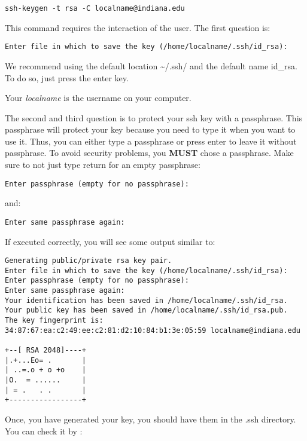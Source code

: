 \begin{verbatim}
ssh-keygen -t rsa -C localname@indiana.edu
\end{verbatim}

This command requires the interaction of the user. The first question
is:

\begin{verbatim}
Enter file in which to save the key (/home/localname/.ssh/id_rsa): 
\end{verbatim}

We recommend using the default location \textasciitilde{}/.ssh/ and the
default name id\_rsa. To do so, just press the enter key.

Your \emph{localname} is the username on your computer.

The second and third question is to protect your ssh key with a
passphrase. This passphrase will protect your key because you need to
type it when you want to use it. Thus, you can either type a passphrase
or press enter to leave it without passphrase. To avoid security
problems, you \textbf{MUST} chose a passphrase. Make sure to not just
type return for an empty passphrase:

\begin{verbatim}
Enter passphrase (empty for no passphrase):
\end{verbatim}

and:

\begin{verbatim}
Enter same passphrase again:
\end{verbatim}

If executed correctly, you will see some output similar to:

\begin{verbatim}
Generating public/private rsa key pair.
Enter file in which to save the key (/home/localname/.ssh/id_rsa): 
Enter passphrase (empty for no passphrase):
Enter same passphrase again:
Your identification has been saved in /home/localname/.ssh/id_rsa.
Your public key has been saved in /home/localname/.ssh/id_rsa.pub.
The key fingerprint is:
34:87:67:ea:c2:49:ee:c2:81:d2:10:84:b1:3e:05:59 localname@indiana.edu

+--[ RSA 2048]----+
|.+...Eo= .       |
| ..=.o + o +o    |
|O.  = ......     |
| = .   . .       |
+-----------------+
\end{verbatim}


Once, you have generated your key, you should have them in the .ssh
directory. You can check it by :

